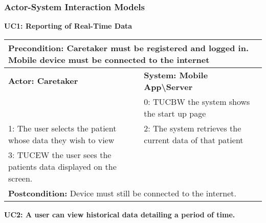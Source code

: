 \subsubsection{Actor-System Interaction Models}
\noindent\textbf{UC1: Reporting of Real-Time Data}
				\begin{flushleft}
					\begin{tabular}{ |p{7cm}|p{7cm}| }
   						\hline
  						\multicolumn{2}{|p{\textwidth}|}{\textbf{Precondition:} Caretaker must be registered and logged in. Mobile device must be connected to the internet} \\
 						\hline
						\textbf {Actor: Caretaker} & \textbf{System: Mobile App\textbackslash Server}\\
						\hline
						 & 0: TUCBW the system shows the start up page\\
						\hline
 						1: The user selects the patient whose data they wish to view & 2: The system retrieves the current data of that patient\\
						\hline
						3: TUCEW the user sees the patients data displayed on the screen. & \\
  						\hline
					\multicolumn{2}{|p{\textwidth}|}{\textbf{Postcondition:} Device must still be connected to the internet.} \\
 						\hline
				\end{tabular}

			\end{flushleft}

			\pagebreak
\noindent\textbf{UC2: A user can view historical data detailing a period of time.}			


